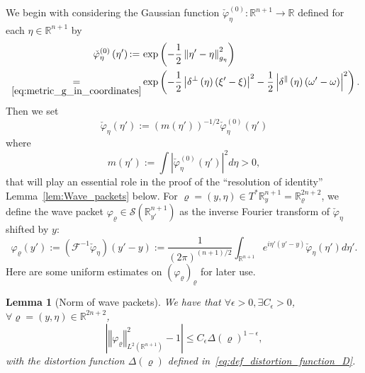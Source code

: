 \documentclass[10pt]{amsart}
\newtheorem{lemm}[theo]{Lemma}\newtheorem{prop}[theo]{Proposition}\newtheorem{coro}[theo]{Corollary}\newtheorem{conj}[theo]{Conjecture}
\theoremstyle{definition}\newtheorem{defi}[theo]{Definition}\newtheorem{rema}[theo]{Remark}\newtheorem{exam}[theo]{Example}\newtheorem{exem}[theo]{Example}\newtheorem{nota}[theo]{Notation}
\newcommand{\clS}{\mathcal{S}}
\newcommand{\clF}{\mathcal{F}}
\newcommand{\bbR}{\mathbb{R}}
\let\oldexists\exists
\renewcommand*{\exists}{\mathrel{\oldexists}}
\let\oldforall\forall
\renewcommand*{\forall}{\mathrel{\oldforall}}
\begin{document}
We begin with considering the Gaussian function $\check{\varphi}_{\eta}^{(0)}:\bbR^{n+1}\to\bbR$ defined for each $\eta\in\bbR^{n+1}$ by
\begin{equation}\label{eq:def_phi_0}
\begin{split}
\check{\varphi}_{\eta}^{\left(0\right)}\left(\eta'\right){:=}\,& \exp\left(-\frac{1}{2}\left\Vert \eta'-\eta\right\Vert _{g_{\eta}}^{2}\right) \\
 \;\underset{\eqref{eq:metric_g_in_coordinates}}{=}&\exp\left(-\frac{1}{2}\left|\delta^{\perp}\left(\eta\right)\left(\xi'-\xi\right)\right|^{2}-\frac{1}{2}\left|\delta^{\parallel}\left(\eta\right)\left(\omega'-\omega\right)\right|^{2}\right).
\end{split}
\end{equation}
Then we set
\begin{equation}\label{eq:def_phi_xi}
\check{\varphi}_{\eta}\left(\eta'\right):=\left(m\left(\eta'\right)\right)^{-1/2}\check{\varphi}_{\eta}^{\left(0\right)}\left(\eta'\right)
\end{equation}
where
\begin{equation}\label{eq:def_m}
m\left(\eta'\right):=\int\left|\check{\varphi}_{\eta}^{\left(0\right)}\left(\eta'\right)\right|^{2}d\eta>0,
\end{equation}
that will play an essential role in the proof of the ``resolution of identity'' Lemma~\ref{lem:Wave_packets} below. For $\varrho=(y,\eta)\in T^{*}\bbR_{y}^{n+1}=\bbR_{\varrho}^{2n+2}$, we define the wave packet $\varphi_{\varrho}\in\clS(\bbR_{y'}^{n+1})$ as the inverse Fourier transform of $\check{\varphi}_{\eta}$ shifted by $y$:
\begin{equation}\label{eq:wave_packet}
\varphi_{\varrho}\left(y'\right) := \left(\clF^{-1}\check{\varphi}_{\eta}\right)\left(y'-y\right):=\frac{1}{\left(2\pi\right)^{\left(n+1\right)/2}}\int_{\bbR^{n+1}}e^{i\eta'\left(y'-y\right)}\check{\varphi}_{\eta}\left(\eta'\right)d\eta'.
\end{equation}
Here are some uniform estimates on $(\varphi_{\varrho})_{\varrho}$ for later use.

\begin{cBoxB}{}
\begin{lemm}[{Norm of wave packets}]\label{lem:norm_wave_packets}
We have that $\forall\epsilon>0,\exists C_{\epsilon}>0$, $\forall\varrho=(y,\eta)\in\bbR^{2n+2}$,
\begin{equation}
\left|\left\Vert \varphi_{\varrho}\right\Vert _{L^{2}\left(\bbR^{n+1}\right)}^{2}-1\right|\leq C_{\epsilon}\Delta\left(\varrho\right)^{1-\epsilon},\label{eq:norme_wave_packet}
\end{equation}
with the distortion function $\Delta(\varrho)$ defined in~\eqref{eq:def_distortion_function_D}.
\end{lemm}
\end{cBoxB}
\end{document}
